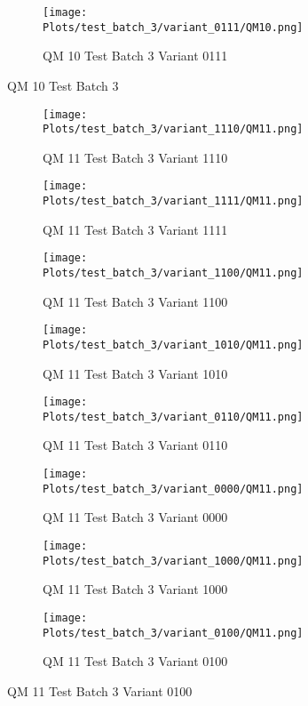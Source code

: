 \documentclass{DissertateFigs}
\begin{document}
\begin{figure}[t!]
\medskip

    \begin{subfigure}{0.47\textwidth}
    \texttt{[image: Plots/test\_batch\_3/variant\_0111/QM10.png]}
    \caption{QM 10 Test Batch 3 Variant 0111}
    \end{subfigure}
\caption{QM 10 Test Batch 3}
    \end{figure}
\clearpage
\begin{figure}[t!]
    \begin{subfigure}{0.47\textwidth}
    \texttt{[image: Plots/test\_batch\_3/variant\_1110/QM11.png]}
    \caption{QM 11 Test Batch 3 Variant 1110}
    \end{subfigure}
    \begin{subfigure}{0.47\textwidth}
    \texttt{[image: Plots/test\_batch\_3/variant\_1111/QM11.png]}
    \caption{QM 11 Test Batch 3 Variant 1111}
    \end{subfigure}

\medskip

    \begin{subfigure}{0.47\textwidth}
    \texttt{[image: Plots/test\_batch\_3/variant\_1100/QM11.png]}
    \caption{QM 11 Test Batch 3 Variant 1100}
    \end{subfigure}
    \begin{subfigure}{0.47\textwidth}
    \texttt{[image: Plots/test\_batch\_3/variant\_1010/QM11.png]}
    \caption{QM 11 Test Batch 3 Variant 1010}
    \end{subfigure}

\medskip

    \begin{subfigure}{0.47\textwidth}
    \texttt{[image: Plots/test\_batch\_3/variant\_0110/QM11.png]}
    \caption{QM 11 Test Batch 3 Variant 0110}
    \end{subfigure}
    \begin{subfigure}{0.47\textwidth}
    \texttt{[image: Plots/test\_batch\_3/variant\_0000/QM11.png]}
    \caption{QM 11 Test Batch 3 Variant 0000}
    \end{subfigure}

\medskip

    \begin{subfigure}{0.47\textwidth}
    \texttt{[image: Plots/test\_batch\_3/variant\_1000/QM11.png]}
    \caption{QM 11 Test Batch 3 Variant 1000}
    \end{subfigure}
    \begin{subfigure}{0.47\textwidth}
    \texttt{[image: Plots/test\_batch\_3/variant\_0100/QM11.png]}
    \caption{QM 11 Test Batch 3 Variant 0100}
    \end{subfigure}


\end{figure}
\end{document}
